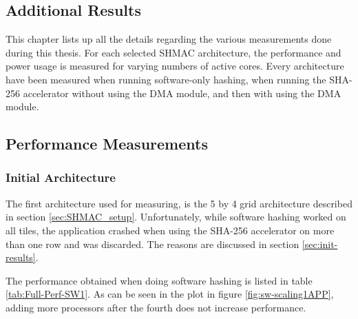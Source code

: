 \begin{appendix}
\chapter{Additional Results}
\label{app:performance}

This chapter lists up all the details regarding the various measurements done during this thesis.
For each selected SHMAC architecture, the performance and power usage is measured for varying numbers
of active cores. Every architecture have been measured when running software-only hashing, when running
the SHA-256 accelerator without using the DMA module, and then with using the DMA module. 

\section{Performance Measurements}

\subsection{Initial Architecture}

The first architecture used for measuring, is the 5 by 4 grid architecture described in section \ref{sec:SHMAC_setup}.
Unfortunately, while software hashing worked on all tiles, the application crashed when using the SHA-256 accelerator on more than one row
and was discarded. The reasons are discussed in section \ref{sec:init-results}.

The performance obtained when doing software hashing is listed in table \ref{tab:Full-Perf-SW1}. 
As can be seen in the plot in figure \ref{fig:sw-scaling1APP}, adding more processors after the fourth does not increase performance.


\end{appendix}

